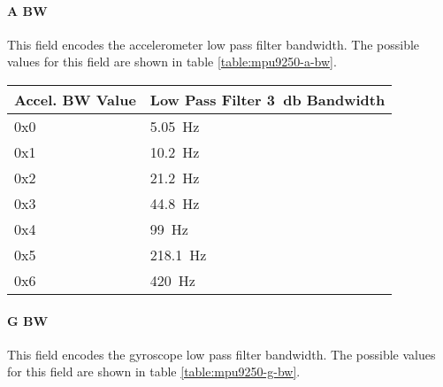 \paragraph{A BW}
This field encodes the accelerometer low pass filter bandwidth. The possible values for this field are shown in table
\ref{table:mpu9250-a-bw}.

\begin{table*}[htb]
    \centering
    \begin{tabular}{@{}ll@{}}
        \toprule
        Accel. BW Value & Low Pass Filter \SI{3}{\decibel} Bandwidth \\
        \midrule
        0x0             & {\SI{5.05}{\hertz}}                        \\
        0x1             & {\SI{10.2}{\hertz}}                        \\
        0x2             & {\SI{21.2}{\hertz}}                        \\
        0x3             & {\SI{44.8}{\hertz}}                        \\
        0x4             & {\SI{99}{\hertz}}                          \\
        0x5             & {\SI{218.1}{\hertz}}                       \\
        0x6             & {\SI{420}{\hertz}}                         \\
        \bottomrule
    \end{tabular}
    \caption{MPU9250 Accelerometer Low Pass Filter Bandwidth Values}
    \label{table:mpu9250-a-bw}
\end{table*}

\paragraph{G BW}
This field encodes the gyroscope low pass filter bandwidth. The possible values for this field are shown in table
\ref{table:mpu9250-g-bw}.

